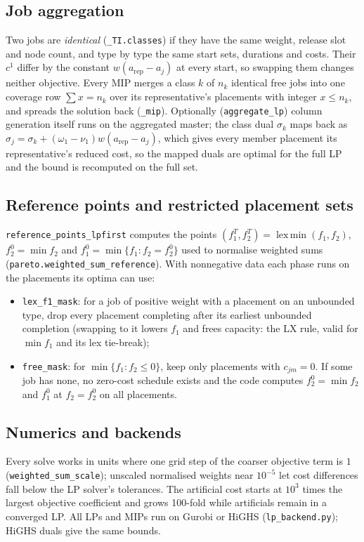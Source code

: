 \documentclass[11pt,a4paper]{article}
\theoremstyle{definition}
\theoremstyle{remark}
\newcommand{\code}[1]{\texttt{#1}}
\begin{document}
\subsection{Job aggregation}
Two jobs are \emph{identical} (\code{\_TI.classes}) if they have the same
weight, release slot and node count, and type by type the same start sets,
durations and costs. Their $c^1$ differ by the constant $w(a_{\mathrm{rep}}-a_j)$
at every start, so swapping them changes neither objective. Every MIP merges a
class $k$ of $n_k$ identical free jobs into one coverage row
$\sum x=n_k$ over its representative's placements with integer $x\le n_k$, and
spreads the solution back (\code{\_mip}). Optionally (\code{aggregate\_lp})
column generation itself runs on the aggregated master; the class dual
$\sigma_k$ maps back as $\sigma_j=\sigma_k+(\omega_1-\nu_1)w(a_{\mathrm{rep}}-a_j)$,
which gives every member placement its representative's reduced cost, so the
mapped duals are optimal for the full LP and the bound is recomputed on the
full set.

\subsection{Reference points and restricted placement sets}\label{sec:lpfirst-refs}
\code{reference\_points\_lpfirst} computes the points
$(f_1^T,f_2^T)=\operatorname{lex\,min}(f_1,f_2)$, $f_2^0=\min f_2$ and
$f_1^0=\min\{f_1:f_2=f_2^0\}$ used to normalise weighted sums
(\code{pareto.weighted\_sum\_reference}). With nonnegative data each phase runs
on the placements its optima can use:
\begin{itemize}[nosep,leftmargin=*]
\item \code{lex\_f1\_mask}: for a job of positive weight with a placement on an
  unbounded type, drop every placement completing after its earliest
  unbounded completion (swapping to it lowers $f_1$ and frees capacity: the
  LX rule, valid for $\min f_1$ and its lex tie-break);
\item \code{free\_mask}: for $\min\{f_1:f_2\le0\}$, keep only placements with
  $c_{jm}=0$. If some job has none, no zero-cost schedule exists and the code
  computes $f_2^0=\min f_2$ and $f_1^0$ at $f_2=f_2^0$ on all placements.
\end{itemize}

\subsection{Numerics and backends}
Every solve works in units where one grid step of the coarser objective term is
$1$ (\code{weighted\_sum\_scale}); unscaled normalised weights near $10^{-5}$
let cost differences fall below the LP solver's tolerances. The artificial
cost starts at $10^3$ times the largest objective coefficient and grows
100-fold while artificials remain in a converged LP. All LPs and MIPs run on
Gurobi or HiGHS (\code{lp\_backend.py}); HiGHS duals give the same bounds.
\end{document}
